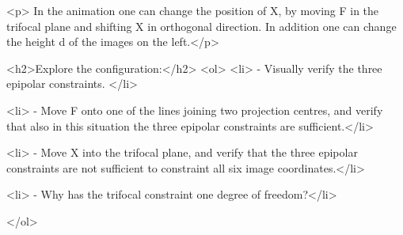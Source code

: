 <p> In the animation one can change the position of X, by moving F in the trifocal plane and shifting X in orthogonal direction. In addition one can change the height d of the images on the left.</p>



    

    <h2>Explore the configuration:</h2>
    <ol>
      <li>  - Visually verify the three epipolar constraints. </li>
			
      <li>  - Move F onto one of the lines joining two projection centres, and verify that also in this situation the three epipolar constraints are sufficient.</li>
			
 			
 			<li>  - Move X into the trifocal plane, and verify that the three epipolar constraints are not sufficient to constraint all six image coordinates.</li>
			
			
			<li>  - Why has the trifocal constraint one degree of freedom?</li>
			
			
 			
	    
	        </ol>
